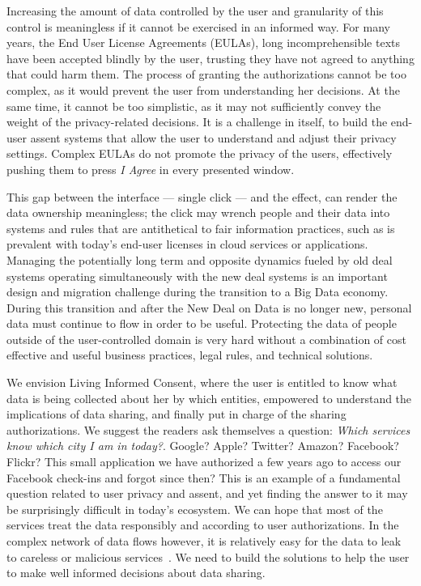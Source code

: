 Increasing the amount of data controlled by the user and granularity of this control is meaningless if it cannot be exercised in an informed way.
For many years, the End User License Agreements (EULAs), long incomprehensible texts have been accepted blindly by the user, trusting they have not agreed to anything that could harm them.
The process of granting the authorizations cannot be too complex, as it would prevent the user from understanding her decisions.
At the same time, it cannot be too simplistic, as it may not sufficiently convey the weight of the privacy-related decisions.
It is a challenge in itself, to build the end-user assent systems that allow the user to understand and adjust their privacy settings.
Complex EULAs do not promote the privacy of the users, effectively pushing them to press \emph{I Agree} in every presented window. 

This gap between the interface --- single click --- and the effect, can render the data ownership meaningless; the click may wrench people and their data into systems and rules that are antithetical to fair information practices, such as is prevalent with today's end-user licenses in cloud services or applications.
Managing the potentially long term and opposite dynamics fueled by old deal systems operating simultaneously with the new deal systems is an important design and migration challenge during the transition to a Big Data economy.
During this transition and after the New Deal on Data is no longer new, personal data must continue to flow in order to be useful.
Protecting the data of people outside of the user-controlled domain is very hard without a combination of cost effective and useful business practices, legal rules, and technical solutions.

We envision Living Informed Consent, where the user is entitled to know what data is being collected about her by which entities, empowered to understand the implications of data sharing, and finally put in charge of the sharing authorizations.
We suggest the readers ask themselves a question: \emph{Which services know which city I am in today?}.
Google? Apple? Twitter? Amazon? Facebook? Flickr?
This small application we have authorized a few years ago to access our Facebook check-ins and forgot since then? 
This is an example of a fundamental question related to user privacy and assent, and yet finding the answer to it may be surprisingly difficult in today's ecosystem.
We can hope that most of the services treat the data responsibly and according to user authorizations.
In the complex network of data flows however, it is relatively easy for the data to leak to  careless or malicious services~\cite{biltongirls}.
We need to build the solutions to help the user to make well informed decisions about data sharing.


